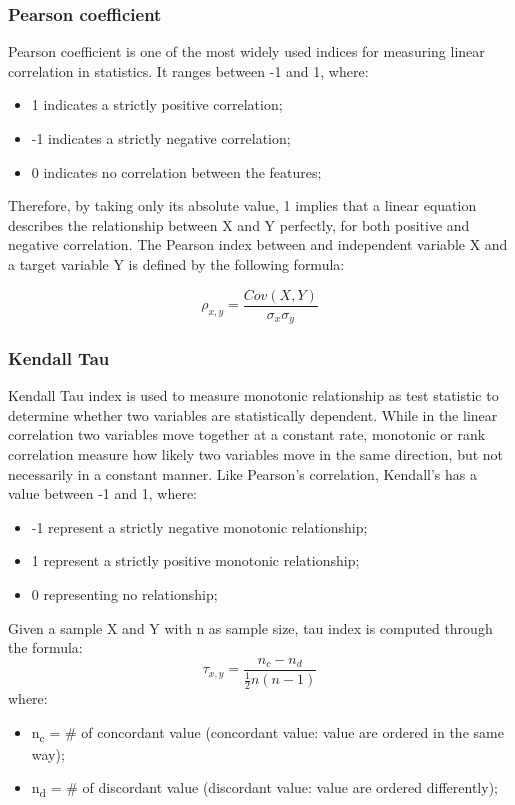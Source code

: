 \subsubsection{Pearson coefficient}
Pearson coefficient is one of the most widely used indices for measuring linear correlation in statistics. It ranges between -1 and 1, where:
\begin{itemize}
\item 1 indicates a strictly positive correlation;
\item -1 indicates a strictly negative correlation;
\item0 indicates no correlation between the features;
\end{itemize}

Therefore, by taking only its absolute value, 1 implies that a linear equation describes the relationship between X and Y perfectly, for both positive and negative correlation. \newline
The Pearson index between and independent variable X and a target variable Y is defined by the following formula:

\begin{equation}
  \rho_{x,y} = \frac{Cov(X,Y)}{\sigma_x\sigma_y}
\end{equation}

\subsubsection{Kendall Tau}
Kendall Tau index is used to measure monotonic relationship as test statistic to determine whether two variables are statistically dependent. \newline
While in the linear correlation two variables move together at a constant rate, monotonic or rank correlation measure how likely two variables move in the same direction, but not necessarily in a constant manner. \newline
Like Pearson’s correlation, Kendall’s has a value between -1 and 1, where:

\begin{itemize}
\item -1 represent a strictly negative monotonic relationship;
\item 1 represent a strictly positive monotonic relationship;
\item 0 representing no relationship;
\end{itemize}
Given a sample X and Y with n as sample size, tau index is computed through the formula:
\begin{equation}
  \tau_{x,y} = \frac{n_c-n_d}{\frac{1}{2}n(n-1)}
\end{equation}
where:
\begin{itemize}
\item n\textsubscript{c} = \# of concordant value (concordant value: value are ordered in the same way);
\item n\textsubscript{d} = \# of discordant value (discordant value: value are ordered differently);
\end{itemize}
